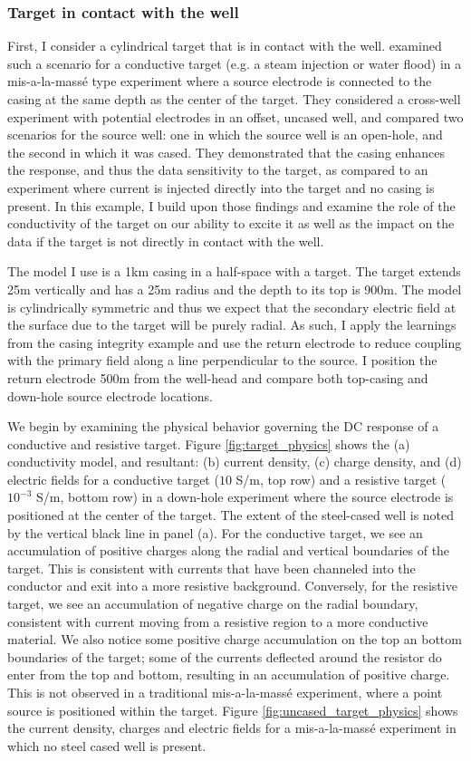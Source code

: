 \subsubsection{Target in contact with the well}
First, I consider a cylindrical target that is in contact with the well. \cite{Schenkel1994} examined such a scenario for a conductive target (e.g. a steam injection or water flood) in a mis-a-la-mass\'e type experiment where a source electrode is connected to the casing at the same depth as the center of the target. They considered a cross-well experiment with potential electrodes in an offset, uncased well, and compared two scenarios for the source well: one in which the source well is an open-hole, and the second in which it was cased. They demonstrated that the casing enhances the response, and thus the data sensitivity to the target, as compared to an experiment where current is injected directly into the target and no casing is present. In this example, I build upon those findings and examine the role of the conductivity of the target on our ability to excite it as well as the impact on the data if the target is not directly in contact with the well.

The model I use is a 1km casing in a half-space with a target. The target extends 25m vertically and has a 25m radius and the depth to its top is 900m. The model is cylindrically symmetric and thus we expect that the secondary electric field at the surface due to the target will be purely radial. As such, I apply the learnings from the casing integrity example and use the return electrode to reduce coupling with the primary field along a line perpendicular to the source. I position the return electrode 500m from the well-head and compare both top-casing and down-hole source electrode locations.

We begin by examining the physical behavior governing the DC response of a conductive and resistive target. Figure \ref{fig:target_physics} shows the (a) conductivity model, and resultant: (b) current density, (c) charge density, and (d) electric fields for a conductive target ($10$ S/m, top row) and a resistive target ($10^{-3}$ S/m, bottom row) in a down-hole experiment where the source electrode is positioned at the center of the target. The extent of the steel-cased well is noted by the vertical black line in panel (a). For the conductive target, we see an accumulation of positive charges along the radial and vertical boundaries of the target. This is consistent with currents that have been channeled into the conductor and exit into a more resistive background. Conversely, for the resistive target, we see an accumulation of negative charge on the radial boundary, consistent with current moving from a resistive region to a more conductive material. We also notice some positive charge accumulation on the top an bottom boundaries of the target; some of the currents deflected around the resistor do enter from the top and bottom, resulting in an accumulation of positive charge. This is not observed in a traditional mis-a-la-mass\'e experiment, where a point source is positioned within the target. Figure \ref{fig:uncased_target_physics} shows the current density, charges and electric fields for a mis-a-la-mass\'e experiment in which no steel cased well is present.

